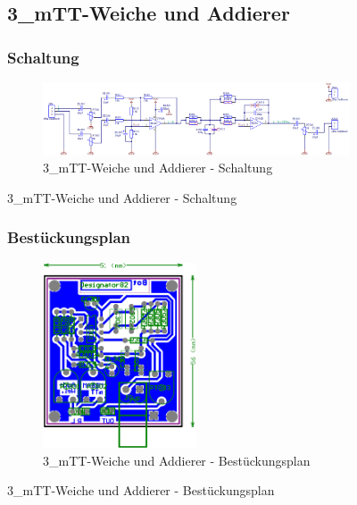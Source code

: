 \begin{figure}
	\subsection{3\_mTT-Weiche und Addierer}
	\subsubsection*{Schaltung}
	\begin{figure} [H]
		\centering
		\includegraphics[width=1\textwidth]{img/Print3/3mTTWeicheruAddiererDiplSchematic.png}
		\caption{3\_mTT-Weiche und Addierer - Schaltung}
		\label {fig:8.10.10}
	\end{figure}
\end{figure}

\begin{figure}
	\subsubsection*{Bestückungsplan}
	\begin{figure} [H]
		\centering
		\includegraphics[width=0.5\textwidth]{img/Print3/3mTTWeicheruAddierer-Best.png}
		\caption{3\_mTT-Weiche und Addierer - Bestückungsplan}
		\label {fig:8.10.11}
	\end{figure}
\end{figure}


